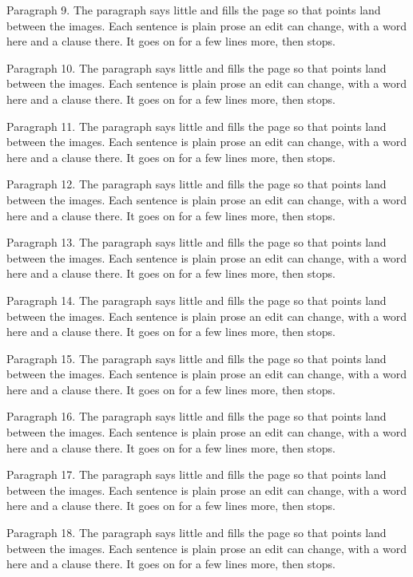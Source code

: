 \documentclass{article}
\begin{document}
Paragraph 9. The paragraph says little and fills the page so that points land between the images. Each sentence is plain prose an edit can change, with a word here and a clause there. It goes on for a few lines more, then stops.

Paragraph 10. The paragraph says little and fills the page so that points land between the images. Each sentence is plain prose an edit can change, with a word here and a clause there. It goes on for a few lines more, then stops.

Paragraph 11. The paragraph says little and fills the page so that points land between the images. Each sentence is plain prose an edit can change, with a word here and a clause there. It goes on for a few lines more, then stops.

Paragraph 12. The paragraph says little and fills the page so that points land between the images. Each sentence is plain prose an edit can change, with a word here and a clause there. It goes on for a few lines more, then stops.

Paragraph 13. The paragraph says little and fills the page so that points land between the images. Each sentence is plain prose an edit can change, with a word here and a clause there. It goes on for a few lines more, then stops.

Paragraph 14. The paragraph says little and fills the page so that points land between the images. Each sentence is plain prose an edit can change, with a word here and a clause there. It goes on for a few lines more, then stops.

Paragraph 15. The paragraph says little and fills the page so that points land between the images. Each sentence is plain prose an edit can change, with a word here and a clause there. It goes on for a few lines more, then stops.

Paragraph 16. The paragraph says little and fills the page so that points land between the images. Each sentence is plain prose an edit can change, with a word here and a clause there. It goes on for a few lines more, then stops.

Paragraph 17. The paragraph says little and fills the page so that points land between the images. Each sentence is plain prose an edit can change, with a word here and a clause there. It goes on for a few lines more, then stops.

Paragraph 18. The paragraph says little and fills the page so that points land between the images. Each sentence is plain prose an edit can change, with a word here and a clause there. It goes on for a few lines more, then stops.
\end{document}
